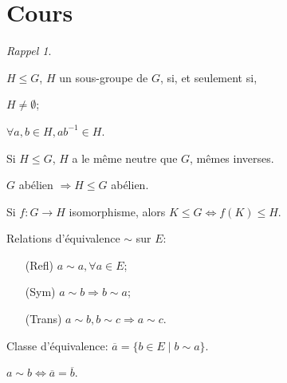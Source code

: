 \documentclass{report}
\newcounter{cours}
\newcommand*{\cours}{\section*{Cours \thecours}\stepcounter{cours}}
\newcommand*{\lte}{\leqslant}
\theoremstyle{definition}
\theoremstyle{remark}
\newtheorem*{rappel}{Rappel}
\begin{document}
	\cours
	\begin{rappel}~

		\begin{ulist}[noitemsep]
			\item $H \lte G$, $H$ un sous-groupe de $G$, si, et seulement si,
			\begin{ulist}
				\item $H \neq \emptyset$;
				\item $\forall a,b \in H, ab^{-1} \in H$.
			\end{ulist}
			\item Si $H \lte G$, $H$ a le m\^eme neutre que $G$, m\^emes inverses.
			\item $G$ ab\'elien $\Rightarrow H \lte G$ ab\'elien.
			\item Si $f:G \to H$ isomorphisme, alors $K \lte G \Leftrightarrow f(K) \lte H$.
			\item Relations d'\'equivalence $\sim$ sur $E$:
			\begin{itemize}
				\item[(Refl)] $a \sim a, \forall a \in E$;
				\item[(Sym)] $a \sim b \Rightarrow b \sim a$;
				\item[(Trans)] $a \sim b, b \sim c \Rightarrow a \sim c$.
			\end{itemize}
			\item Classe d'\'equivalence: $\overline{a} = \{b \in E \mid b \sim a\}$.
			\item $a \sim b \Longleftrightarrow \overline{a} = \overline{b}$.
		\end{ulist}
	\end{rappel}
\end{document}

